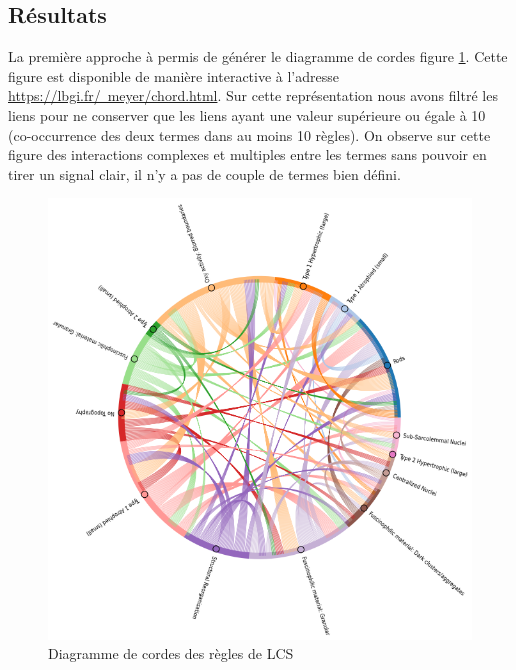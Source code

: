 \subsection{Résultats}
La première approche à permis de générer le diagramme de cordes figure \ref{fig:chords}.  Cette figure est disponible de manière interactive à l'adresse \href{https://lbgi.fr/~meyer/chord.html}{https://lbgi.fr/~meyer/chord.html}. Sur cette représentation nous avons filtré les liens pour ne conserver que les liens ayant une valeur supérieure ou égale à 10 (co-occurrence des deux termes dans au moins 10 règles). On observe sur cette figure des interactions complexes et multiples entre les termes sans pouvoir en tirer un signal clair, il n'y a pas de couple de termes bien défini.
\begin{figure}[!ht]
  \centering
  \includegraphics[width=1\textwidth]{figures/chord_plot.png}
  \caption[Diagramme de cordes des règles de LCS]{Diagramme de cordes des règles de LCS}
  \label{fig:chords}
\end{figure}

